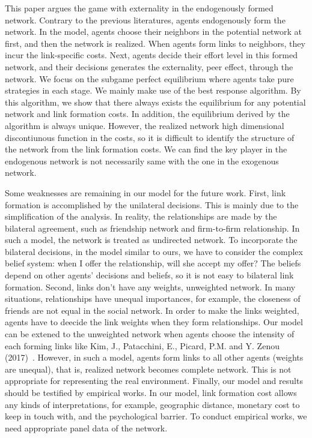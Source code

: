 \documentclass[12pt]{article}
\theoremstyle{definition}
\begin{document}
This paper argues the game with externality in the endogenously formed network.
Contrary to the previous literatures, agents endogenously form the network.
In the model, agents choose their neighbors in the potential network at first, and then the network is realized.
When agents form links to neighbors, they incur the link-specific costs.
Next, agents decide their effort level in this formed network, and their decisions generates the externality, peer effect, through the network.
We focus on the subgame perfect equilibrium where agents take pure strategies in each stage.
We mainly make use of the best response algorithm.
By this algorithm, we show that there always exists the equilibrium for any potential network and link formation costs.
In addition, the equilibrium derived by the algorithm is always unique.
However, the realized network high dimensional discontiunous function in the costs, so it is difficult to identify the structure of the network from the link formation costs.
We can find the key player in the endogenous network is not necessarily same with the one in the exogenous network.

Some weaknesses are remaining in our model for the future work.
First, link formation is accomplished by the unilateral decisions.
This is mainly due to the simplification of the analysis.
In reality, the relationships are made by the bilateral agreement, such as friendship network and firm-to-firm relationship.
In such a model, the network is treated as undirected network.
To incorporate the bilateral decisions, in the model similar to ours, we have to consider the complex belief system: when I offer the relationship, will she accept my offer?
The beliefs depend on other agents' decisions and beliefs, so it is not easy to bilateral link formation.
Second, links don't have any weights, unweighted network.
In many situations, relationships have unequal importances, for example, the closeness of friends are not equal in the social network.
In order to make the links weighted, agents have to deecide the link weights when they form relationships.
Our model can be extened to the unweighted network when agents choose the intensity of each forming links like Kim, J., Patacchini, E., Picard, P.M. and Y. Zenou (2017)~\cite{Urban}.
However, in such a model, agents form links to all other agents (weights are unequal), that is, realized network becomes complete network.
This is not appropriate for representing the real environment.
Finally, our model and results should be testified by empirical works.
In our model, link formation cost allows any kinds of interpretations, for example, geographic distance, monetary cost to keep in touch with, and the psychological barrier.
To conduct empirical works, we need appropriate panel data of the network.
\end{document}
